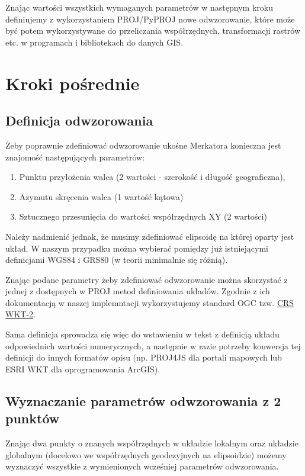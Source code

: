 \documentclass{article}
\begin{document}
Znając wartości wszystkich wymaganych parametrów w następnym kroku definiujemy z wykorzystaniem PROJ/PyPROJ nowe odwzorowanie, 
które może być potem wykorzystywane do przeliczania współrzędnych, transformacji rastrów etc. w programach i bibliotekach do danych GIS.


\section{Kroki pośrednie}
\subsection{Definicja odwzorowania}
Żeby poprawnie zdefiniować odwzorowanie ukośne Merkatora konieczna jest znajomość następujących parametrów:
\begin{enumerate}
\item Punktu przyłożenia walca (2 wartości - szerokość i długość geograficzna),
\item Azymutu skręcenia walca (1 wartość kątowa)
\item Sztucznego przesunięcia do wartości współrzędnych XY (2 wartości)
\end{enumerate}
Należy nadmienić jednak, że musimy zdefiniować elipsoidę na której oparty jest układ. W naszym przypadku można wybierać pomiędzy
już istniejącymi definicjami WGS84 i GRS80 (w teorii minimalnie się różnią).

Znając podane parametry żeby zdefiniować odwzorowanie można skorzystać z jednej z dostępnych w PROJ metod definiowania układów.
Zgodnie z ich dokumentacją w naszej implemntacji wykorzystujemy standard OGC tzw. \href{https://proj.org/en/stable/faq.html#what-is-the-best-format-for-describing-coordinate-reference-systems}{CRS WKT-2}.

Sama definicja sprowadza się więc do wstawieniu w tekst z definicją układu odpowiednich wartości numerycznych, a następnie w razie potrzeby konwersja tej definicji do innych formatów opisu (np. PROJ4JS 
dla portali mapowych lub ESRI WKT dla oprogramowania ArcGIS). 

\subsection{Wyznaczanie parametrów odwzorowania z 2 punktów}
Znając dwa punkty o znanych współrzędnych w układzie lokalnym oraz układzie globalnym (docelowo we współrzędnych geodezyjnych na elipsoidzie) możemy wyznaczyć wszystkie z wymienionych wcześniej parametrów odwzorowania.
\end{document}
